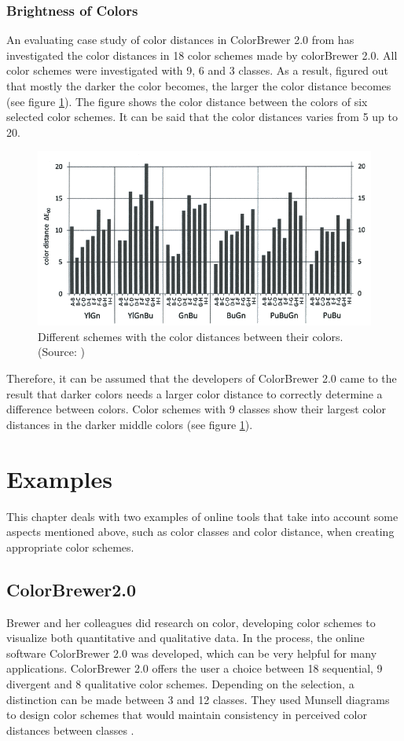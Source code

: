 \subsubsection{Brightness of Colors}

An evaluating case study of color distances in ColorBrewer 2.0 from \textcite{brychtovaC2017} has investigated the color distances in 18 color schemes made by colorBrewer 2.0. All color schemes were investigated with 9, 6 and 3 classes. As a result, \textcite{brychtovaC2017} figured out that mostly the darker the color becomes, the larger the color distance becomes (see figure \ref{fig:colordist}). The figure shows the color distance between the colors of six selected color schemes. It can be said that the color distances varies from 5 up to 20.

\begin{figure}
	\centering
	\includegraphics[width=0.7\linewidth]{source/images/colordist}
	\caption{Different schemes with the color distances between their colors. \\ (Source: \textcite{brychtovaC2017})}
	\label{fig:colordist}
\end{figure}

Therefore, it can be assumed that the developers of ColorBrewer 2.0 came to the result that darker colors needs a larger color distance to correctly determine a difference between colors. Color schemes with 9 classes show their largest color distances in the darker middle colors (see figure \ref{fig:colordist}).

\section{Examples}
This chapter deals with two examples of online tools that take into account some aspects mentioned above, such as color classes and color distance, when creating appropriate color schemes. 

\subsection{ColorBrewer2.0}
Brewer and her colleagues \parencite{brewer2003, brewer1994, brewer1996, brewer1997, brewer1999} did research on color, developing color schemes to visualize both quantitative and qualitative data. In the process, the online software ColorBrewer 2.0 was developed, which can be very helpful for many applications. ColorBrewer 2.0 offers the user a choice between 18 sequential, 9 divergent and 8 qualitative color schemes. Depending on the selection, a distinction can be made between 3 and 12 classes. They used Munsell diagrams to design color schemes that would maintain consistency in perceived color distances between classes \parencite{brychtovaC2017}. 

